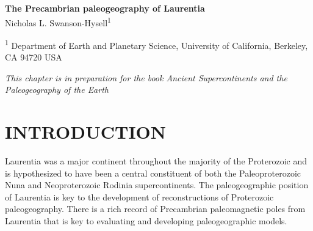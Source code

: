 \documentclass[11pt,letterpaper]{article}
\begin{document}
\begin{flushleft}
{\Large \textbf{The Precambrian paleogeography of Laurentia}}
\\

Nicholas L. Swanson-Hysell\textsuperscript{1}

\bigskip

\textsuperscript{1} Department of Earth and Planetary Science, University of California, Berkeley, CA 94720 USA

\end{flushleft}

\noindent\textit{This chapter is in preparation for the book Ancient Supercontinents and the Paleogeography of the Earth}


\section*{INTRODUCTION}

Laurentia was a major continent throughout the majority of the Proterozoic and is hypothesized to have been a central constituent of both the Paleoproterozoic Nuna and Neoproterozoic Rodinia supercontinents. The paleogeographic position of Laurentia is key to the development of reconstructions of Proterozoic paleogeography. There is a rich record of Precambrian paleomagnetic poles from Laurentia that is key to evaluating and developing paleogeographic models.
\end{document}
